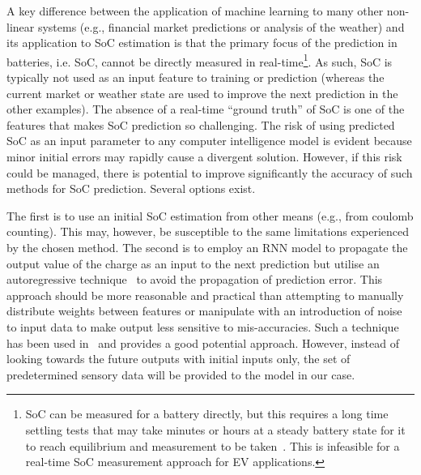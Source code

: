 %
%
A key difference between the application of machine learning to many other non-linear systems (e.g., financial market predictions or analysis of the weather) and its application to SoC estimation is that the primary focus of the prediction in batteries, i.e. SoC, cannot be directly measured in real-time\footnote{SoC can be measured for a battery directly, but this requires a long time settling tests that may take minutes or hours at a steady battery state for it to reach equilibrium and measurement to be taken~\cite{ali_towards_2019}. This is infeasible for a real-time SoC measurement approach for EV applications.}.
As such, SoC is typically not used as an input feature to training or prediction (whereas the current market or weather state are used to improve the next prediction in the other examples).
The absence of a real-time “ground truth” of SoC is one of the features that makes SoC prediction so challenging.
The risk of using predicted SoC as an input parameter to any computer intelligence model is evident because minor initial errors may rapidly cause a divergent solution.
However, if this risk could be managed, there is potential to improve significantly the accuracy of such methods for SoC prediction.
Several options exist.

%
%
The first is to use an initial SoC estimation from other means (e.g., from coulomb counting).
This may, however, be susceptible to the same limitations experienced by the chosen method.
The second is to employ an RNN model to propagate the output value of the charge as an input to the next prediction but utilise an autoregressive technique~\cite{time_2020} to avoid the propagation of prediction error.
This approach should be more reasonable and practical than attempting to manually distribute weights between features or manipulate with an introduction of noise to input data to make output less sensitive to mis-accuracies.
Such a technique has been used in~\cite{time_2020} and provides a good potential approach.
However, instead of looking towards the future outputs with initial inputs only, the set of predetermined sensory data will be provided to the model in our case.

